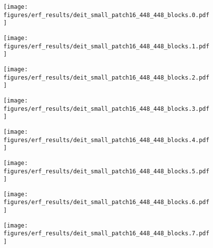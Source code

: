 \documentclass{article}
\begin{document}
\begin{figure}[tb]
  \raggedright
  \begin{minipage}[t]{0.13\hsize}
    \centering
    \texttt{[image: figures/erf\_results/deit\_small\_patch16\_448\_448\_blocks.0.pdf]}
    \label{figure:erf_deit_448:0}
  \end{minipage}
  \begin{minipage}[t]{0.13\hsize}
    \centering
    \texttt{[image: figures/erf\_results/deit\_small\_patch16\_448\_448\_blocks.1.pdf]}
    \label{figure:erf_deit_448:1}
  \end{minipage}
  \begin{minipage}[t]{0.13\hsize}
    \centering
    \texttt{[image: figures/erf\_results/deit\_small\_patch16\_448\_448\_blocks.2.pdf]}
    \label{figure:erf_deit_448:2}
  \end{minipage}
  \begin{minipage}[t]{0.13\hsize}
    \centering
    \texttt{[image: figures/erf\_results/deit\_small\_patch16\_448\_448\_blocks.3.pdf]}
    \label{figure:erf_deit_448:3}
  \end{minipage}
  \begin{minipage}[t]{0.13\hsize}
    \centering
    \texttt{[image: figures/erf\_results/deit\_small\_patch16\_448\_448\_blocks.4.pdf]}
    \label{figure:erf_deit_448:4}
  \end{minipage}
  \begin{minipage}[t]{0.13\hsize}
    \centering
    \texttt{[image: figures/erf\_results/deit\_small\_patch16\_448\_448\_blocks.5.pdf]}
    \label{figure:erf_deit_448:5}
  \end{minipage}
  \begin{minipage}[t]{0.13\hsize}
    \centering
    \texttt{[image: figures/erf\_results/deit\_small\_patch16\_448\_448\_blocks.6.pdf]}
    \label{figure:erf_deit_448:6}
  \end{minipage}
  \begin{minipage}[t]{0.13\hsize}
    \centering
    \texttt{[image: figures/erf\_results/deit\_small\_patch16\_448\_448\_blocks.7.pdf]}
    \label{figure:erf_deit_448:7}
  \end{minipage}
  \begin{minipage}[t]{0.13\hsize}
    \centering

\end{minipage}
\end{figure}
\end{document}
